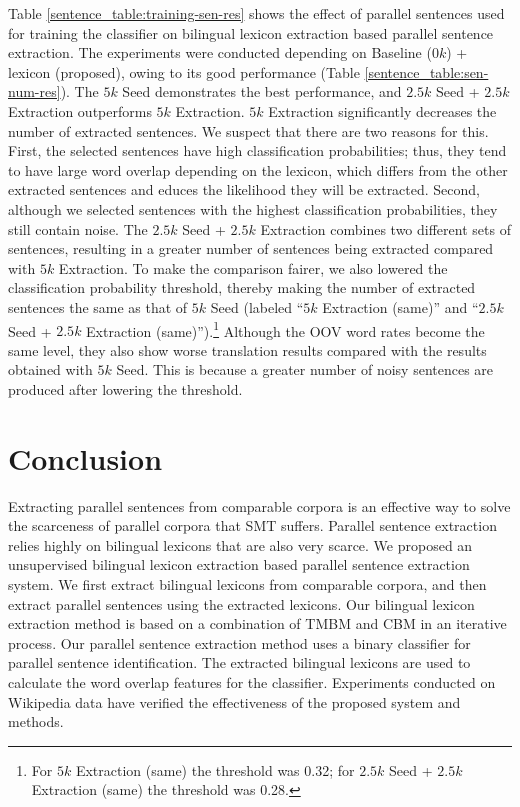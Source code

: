 \documentclass[english]{jnlp_1.4}
\begin{document}
Table \ref{sentence_table:training-sen-res} shows the effect of parallel sentences 
used for training the classifier on bilingual lexicon extraction based parallel sentence 
extraction. The experiments were conducted depending on Baseline ($0k$) + lexicon (proposed),
owing to its good performance (Table \ref{sentence_table:sen-num-res}). 
The $5k$ Seed demonstrates the best performance, and $2.5k$ Seed + $2.5k$ Extraction outperforms $5k$ Extraction.
$5k$ Extraction significantly decreases the number of extracted sentences. We suspect that there are
two reasons for this.  First, the selected sentences have high classification probabilities; thus, they tend to have 
large word overlap depending on the lexicon, which differs from the other extracted sentences and educes the likelihood 
they will be extracted. Second, although we selected sentences with the highest classification probabilities, they
still contain noise. The $2.5k$ Seed + $2.5k$ Extraction combines two different sets of sentences, resulting in a greater number of
sentences being extracted compared with $5k$ Extraction. To make the comparison fairer, we also lowered the 
classification probability threshold, thereby making the number of extracted sentences the same as that of $5k$ Seed (labeled 
``$5k$ Extraction (same)'' and ``$2.5k$ Seed + $2.5k$ Extraction (same)'').\footnote{For $5k$ Extraction (same) the threshold 
was 0.32; for $2.5k$ Seed + $2.5k$ Extraction (same) the threshold was 0.28.} 
Although the OOV word rates become the same level, they also show worse translation results compared with the 
results obtained with $5k$ Seed. This is because a greater number of noisy sentences are produced after lowering the threshold.


\section{Conclusion}

Extracting parallel sentences from comparable corpora is an effective way to solve the scarceness 
of parallel corpora that SMT suffers. Parallel sentence extraction relies highly on bilingual 
lexicons that are also very scarce. We proposed an unsupervised bilingual lexicon extraction 
based parallel sentence extraction system. We first extract bilingual lexicons from comparable 
corpora, and then extract parallel sentences using the extracted lexicons. Our bilingual lexicon 
extraction method is based on a combination of TMBM and CBM in an iterative process. Our parallel 
sentence extraction method uses a binary classifier for parallel sentence identification. The 
extracted bilingual lexicons are used to calculate the word overlap features for the classifier. 
Experiments conducted on Wikipedia data have verified the effectiveness of the proposed system and methods.
\end{document}

